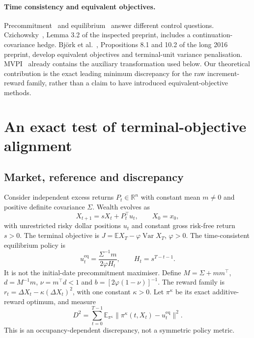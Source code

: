 \documentclass[sigconf,anonymous,review]{acmart}
\newcommand{\E}{\mathbb{E}}
\newcommand{\Var}{\operatorname{Var}}
\newcommand{\eq}{\mathrm{eq}}
\begin{document}
\paragraph{Time consistency and equivalent objectives.}
Precommitment~\cite{ling2000} and equilibrium~\cite{basak2010,dai2023} answer different control questions. Czichowsky~\cite{czichowsky2013}, Lemma 3.2 of the inspected preprint, includes a continuation-covariance hedge. Bj\"ork et al.~\cite{bkm2016}, Propositions 8.1 and 10.2 of the long 2016 preprint, develop equivalent objectives and terminal-unit variance penalisation. MVPI~\cite{zhang2021} already contains the auxiliary transformation used below. Our theoretical contribution is the exact leading minimum discrepancy for the raw increment-reward family, rather than a claim to have introduced equivalent-objective methods.

\section{An exact test of terminal-objective alignment}
\subsection{Market, reference and discrepancy}
Consider independent excess returns $P_t\in\mathbb R^n$ with constant mean $m\ne0$ and positive definite covariance $\Sigma$. Wealth evolves as
\begin{equation}
 X_{t+1}=sX_t+P_t^\top u_t,\qquad X_0=x_0,
\end{equation}
with unrestricted risky dollar positions $u_t$ and constant gross risk-free return $s>0$. The terminal objective is $J=\E X_T-\varphi\Var X_T$, $\varphi>0$. The time-consistent equilibrium policy is
\begin{equation}
 u_t^\eq=\frac{\Sigma^{-1}m}{2\varphi H_t},\qquad H_t=s^{T-t-1}.
\end{equation}
It is not the initial-date precommitment maximiser. Define $M=\Sigma+mm^\top$, $d=M^{-1}m$, $\nu=m^\top d<1$ and $b=[2\varphi(1-\nu)]^{-1}$. The reward family is $r_t=\Delta X_t-\kappa(\Delta X_t)^2$, with one constant $\kappa>0$. Let $\pi^\kappa$ be its exact additive-reward optimum, and measure
\begin{equation}
 D^2=\sum_{t=0}^{T-1}\E_{\pi^\kappa}\|\pi^\kappa(t,X_t)-u_t^\eq\|^2.
\end{equation}
This is an occupancy-dependent discrepancy, not a symmetric policy metric.
\end{document}
